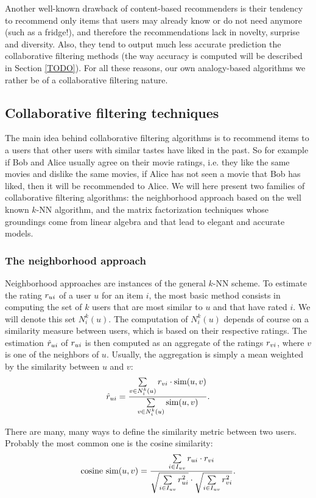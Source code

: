 Another well-known drawback of content-based recommenders is their tendency to
recommend only items that users may already know or do not need anymore (such
as a fridge!), and therefore the recommendations lack in novelty, surprise and
diversity. Also, they tend to output much less accurate prediction the
collaborative filtering methods (the way accuracy is computed will be described
in Section \ref{TODO}). For all these reasons, our own analogy-based algorithms
we rather be of a collaborative filtering nature.

\subsection{Collaborative filtering techniques}
\label{SEC:collaborative_filtering}

The main idea behind collaborative filtering algorithms is to recommend items
to a users that other users with similar tastes have liked in the past. So for
example if Bob and Alice usually agree on their movie ratings, i.e. they like
the same movies and dislike the same movies, if Alice has not seen a movie that
Bob has liked, then it will be recommended to Alice. We will here present two
families of collaborative filtering algorithms: the neighborhood approach based
on the well known $k$-NN algorithm, and the matrix factorization techniques
whose groundings come from linear algebra and that lead to elegant and accurate
models.

\subsubsection{The neighborhood approach}

Neighborhood approaches are instances of the general $k$-NN scheme. To estimate
the rating $r_{ui}$ of a user $u$ for an item $i$, the most basic method consists
in computing  the set of $k$ users that are most similar to $u$ and
that have rated $i$. We will denote this set $N_i^k(u)$. The computation of
$N_i^k(u)$ depends of course on a similarity measure between users, which is
based on their respective ratings.  The estimation $\hat{r}_{ui}$ of $r_{ui}$ is then
computed as an aggregate of the ratings $r_{vi}$, where $v$ is one of the
neighbors of $u$. Usually, the aggregation is simply a mean weighted by the
similarity between $u$ and $v$: $$\hat{r}_{ui} = \frac{\sum\limits_{v \in N_i^k(u)}
r_{vi} \cdot \text{sim}(u, v)} {\sum\limits_{v \in N_i^k(u)}\text{sim}(u, v)}.$$

There are many, many ways to define the similarity metric between two users.
Probably the most common one is the cosine similarity:
$$
\text{cosine sim}(u, v) = \frac{ \sum\limits_{i \in I_{uv}} r_{ui} \cdot r_{vi}}
{\sqrt{\sum\limits_{i \in I_{uv}} r_{ui}^2} \cdot \sqrt{\sum\limits_{i \in I_{uv}}
r_{vi}^2}}.
$$

